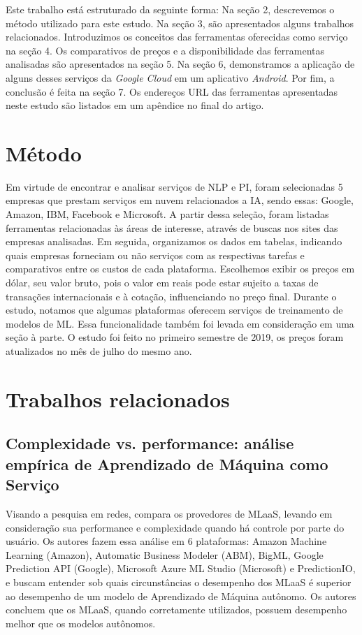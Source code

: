 \documentclass{article}
\begin{document}
Este trabalho está estruturado da seguinte forma: Na seção 2, descrevemos o método utilizado para este estudo. Na seção 3, são apresentados alguns trabalhos relacionados. Introduzimos os conceitos das ferramentas oferecidas como serviço na seção 4. Os comparativos de preços e a disponibilidade das ferramentas analisadas são apresentados na seção 5. Na seção 6, demonstramos a aplicação de alguns desses serviços da \textit{Google Cloud} em um aplicativo \textit{Android}. Por fim, a conclusão é feita na seção 7. Os endereços URL das ferramentas apresentadas neste estudo são listados em um apêndice no final do artigo.

\section{Método}
Em virtude de encontrar e analisar serviços de NLP e PI, foram selecionadas 5 empresas que prestam serviços em nuvem relacionados a IA, sendo essas: Google, Amazon, IBM, Facebook e Microsoft. A partir dessa seleção, foram listadas ferramentas relacionadas às áreas de interesse, através de buscas nos sites das empresas analisadas. Em seguida, organizamos os dados em tabelas, indicando quais empresas forneciam ou não serviços com as respectivas tarefas e comparativos entre os custos de cada plataforma. Escolhemos exibir os preços em dólar, seu valor bruto, pois o valor em reais pode estar sujeito a taxas de transações internacionais e à cotação, influenciando no preço final. Durante o estudo, notamos que algumas plataformas oferecem serviços de treinamento de modelos de ML. Essa funcionalidade também foi levada em consideração em uma seção à parte. O estudo foi feito no primeiro semestre de 2019, os preços foram atualizados no mês de julho do mesmo ano.

\section{Trabalhos relacionados}
\subsection{Complexidade vs. performance: análise empírica de Aprendizado de Máquina como Serviço}
Visando a pesquisa em redes, \cite{yao2017} compara os provedores de MLaaS, levando em consideração sua performance e complexidade quando há controle por parte do usuário. Os autores fazem essa análise em 6 plataformas: Amazon Machine Learning (Amazon), Automatic Business Modeler (ABM), BigML, Google Prediction API (Google), Microsoft Azure ML Studio (Microsoft) e PredictionIO, e buscam entender sob quais circunstâncias o desempenho dos MLaaS é superior ao desempenho de um modelo de Aprendizado de Máquina autônomo. Os autores concluem que os MLaaS, quando corretamente utilizados, possuem desempenho melhor que os modelos autônomos. 
\end{document}
